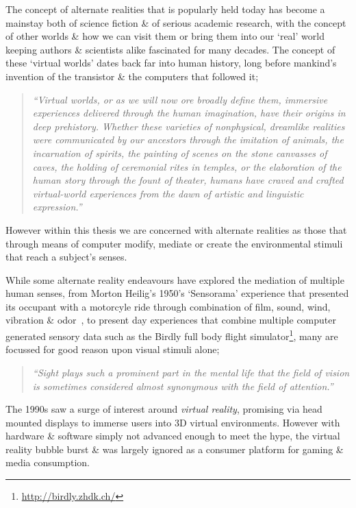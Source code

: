 The concept of alternate realities that is popularly held today has become a mainstay both of science fiction \& of serious academic research, with the concept of other worlds \& how we can visit them or bring them into our `real' world keeping authors \& scientists alike fascinated for many decades. The concept of these `virtual worlds' dates back far into human history, long before mankind's invention of the transistor \& the computers that followed it;

\begin{quote}
	\textit{``Virtual worlds, or as we will now ore broadly define them, immersive experiences delivered through the human imagination, have their origins in deep prehistory. Whether these varieties of nonphysical, dreamlike realities were communicated by our ancestors through the imitation of animals, the incarnation of spirits, the painting of scenes on the stone canvasses of caves, the holding of ceremonial rites in temples, or the elaboration of the human story through the fount of theater, humans have craved and crafted virtual-world experiences from the dawn of artistic and linguistic expression.''}~\cite{Damer2014}
\end{quote}

However within this thesis we are concerned with alternate realities as those that through means of computer modify, mediate or create the environmental stimuli that reach a subject's senses.

While some alternate reality endeavours have explored the mediation of multiple human senses, from Morton Heilig's 1950's `Sensorama' experience that presented its occupant with a motorcyle ride through combination of film, sound, wind, vibration \& odor~\cite{Rheingold1992}, to present day experiences that combine multiple computer generated sensory data such as the Birdly full body flight simulator\footnote{\url{http://birdly.zhdk.ch/}}, many are focussed for good reason upon visual stimuli alone;

\begin{quote}
	\textit{``Sight plays such a prominent part in the mental life that the field of vision is sometimes considered almost synonymous with the field of attention.''}~\cite{Lucas1951}
\end{quote}

The 1990s saw a surge of interest around \textit{virtual reality}, promising via head mounted displays to immerse users into 3D virtual environments. However with hardware \& software simply not advanced enough to meet the hype, the virtual reality bubble burst \& was largely ignored as a consumer platform for gaming \& media consumption.

